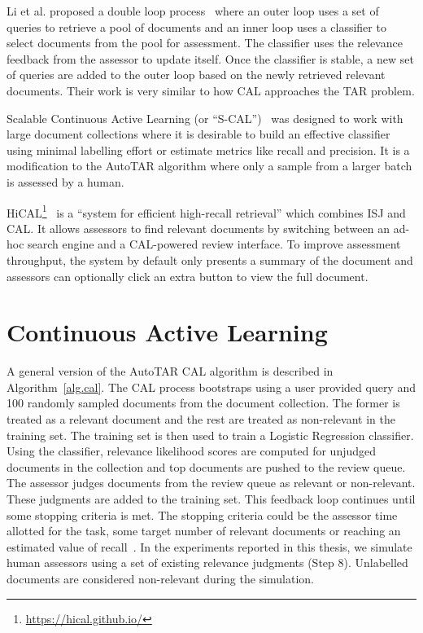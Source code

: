 Li et al. proposed a double loop process~\cite{li2014req} where an outer loop uses a set of
queries to retrieve a pool of documents and an inner loop uses a classifier to
select documents from the pool for assessment. The classifier uses the relevance
feedback from the assessor to update itself. Once the classifier is stable, a new
set of queries are added to the outer loop based on the newly retrieved relevant
documents. Their work is very similar to how CAL approaches the TAR problem.

Scalable Continuous Active Learning (or ``S-CAL'')~\cite{cormack2016scalability}
was designed to work with large document collections where it is desirable to
build an effective classifier using minimal labelling effort or estimate metrics
like recall and precision. It is a modification to the AutoTAR algorithm
where only a sample from a larger batch is assessed by a human.

HiCAL\footnote{\url{https://hical.github.io/}}~\cite{sigirdemo} is a ``system for efficient high-recall retrieval'' which
combines ISJ and CAL. It allows assessors to find relevant documents by
switching between an ad-hoc search engine and a CAL-powered review interface.
To improve assessment throughput, the system by default only presents a summary
of the document and assessors can optionally click an extra button to view the
full document.

\section{Continuous Active Learning}
\label{sec:cal}

A general version of the AutoTAR CAL algorithm is described in
Algorithm~\ref{alg.cal}. The CAL process bootstraps using a user provided query
and 100 randomly sampled documents from the document collection. The former is
treated as a relevant document and the rest are treated as non-relevant in the
training set. The training set is then used to train a Logistic Regression
classifier. Using the classifier, relevance likelihood scores are computed
for unjudged documents in the collection and top documents are pushed to
the review queue. The assessor judges documents from the review queue as
relevant or non-relevant. These judgments are added to the training set. This
feedback loop continues until some stopping criteria is met. The stopping
criteria could be the assessor time allotted for the task, some target number of
relevant documents or reaching an estimated value of
recall~\cite{cormack2016engineering}. In the experiments reported in this
thesis, we simulate human assessors using a set of existing relevance judgments
(Step 8). Unlabelled documents are considered non-relevant during the
simulation.

